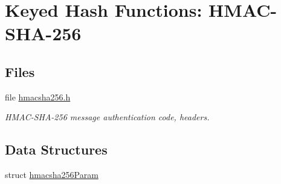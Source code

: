 \hypertarget{group__HMAC__sha256__m}{
\section{Keyed Hash Functions: HMAC-SHA-256}
\label{group__HMAC__sha256__m}
}
\subsection*{Files}
\begin{CompactItemize}
\item 
file \hyperlink{hmacsha256_8h}{hmacsha256.h}
\begin{CompactList}\small\item\em HMAC-SHA-256 message authentication code, headers. \item\end{CompactList}

\end{CompactItemize}
\subsection*{Data Structures}
\begin{CompactItemize}
\item 
struct \hyperlink{structhmacsha256Param}{hmacsha256Param}
\end{CompactItemize}
